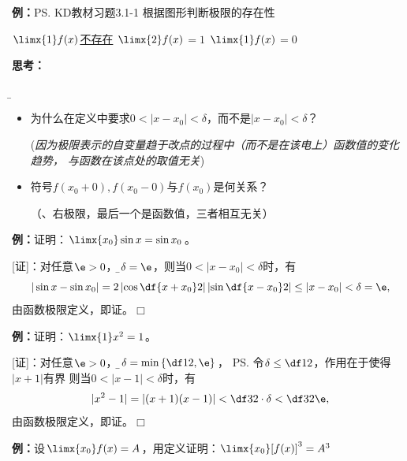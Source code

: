 {\bf 例：}\ps{KD教材习题3.1-1}
根据图形判断极限的存在性
\begin{center}
	
	$\limx{1}f(x)$\underline{不存在}
	\quad $\limx{2}f(x)$\underline{$=1$}
	\quad $\limx{1}f(x)$\underline{$=0$}
\end{center}

{\bf 思考：}{\b
	\begin{itemize}
	  \setlength{\itemindent}{1cm}
	  \item 为什么在定义中要求$0<|x-x_0|<\delta$，而不是$|x-x_0|<\delta$？
	  
	   \quad ({\it 因为极限表示的自变量趋于改点的过程中（而不是在该电上）函数值的变化趋势，
	   与函数在该点处的取值无关})
	  \item 符号$f(x_0+0),f(x_0-0)$与$f(x_0)$是何关系？
	  
	  \quad （{、右极限，最后一个是函数值，三者相互无关}）
	\end{itemize}
}

{\bf 例：}证明：$\limx{x_0}\sin x=\sin x_0$。

[证]：对任意$\e>0$，令{\b$\delta=\e$}，则当$0<|x-x_0|<\delta$时，有
$$|\sin x-\sin x_0|=2\left|\cos\df{x+x_0}2\right|
\left|\sin\df{x-x_0}2\right|\leq|x-x_0|<\delta=\e,$$
由函数极限定义，即证。\hfill $\Box$

{\bf 例：}证明：$\limx{1}x^2=1$。

[证]：对任意$\e>0$，令{\b$\delta=\min\left\{\df12,\e\right\}$}，
\ps{令$\delta\leq\df12$，作用在于使得$|x+1|$有界}
则当$0<|x-1|<\delta$时，有
$$|x^2-1|=|(x+1)(x-1)|<\df32\cdot\delta<\df32\e,$$
由函数极限定义，即证。\hfill $\Box$

{\bf 例：}设$\limx{x_0}f(x)=A$，用定义证明：$\limx{x_0}[f(x)]^3=A^3$

